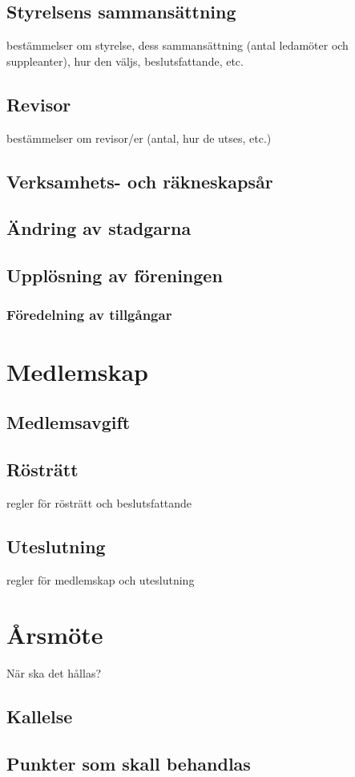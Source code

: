 \documentclass{article}
\begin{document}
\subsection{Styrelsens sammansättning}
bestämmelser om styrelse, dess sammansättning (antal ledamöter och suppleanter), hur den väljs, beslutsfattande, etc. 

\subsection{Revisor}
bestämmelser om revisor/er (antal, hur de utses, etc.) 


\subsection{Verksamhets- och räkneskapsår}

\subsection{Ändring av stadgarna}

\subsection{Upplösning av föreningen}

\subsubsection{Föredelning av tillgångar}



\section{Medlemskap}
\subsection{Medlemsavgift}
\subsection{Rösträtt}
regler för rösträtt och beslutsfattande

\subsection{Uteslutning}
regler för medlemskap och uteslutning 


\section{Årsmöte}
När ska det hållas?
\subsection{Kallelse}
\subsection{Punkter som skall behandlas}
\end{document}
